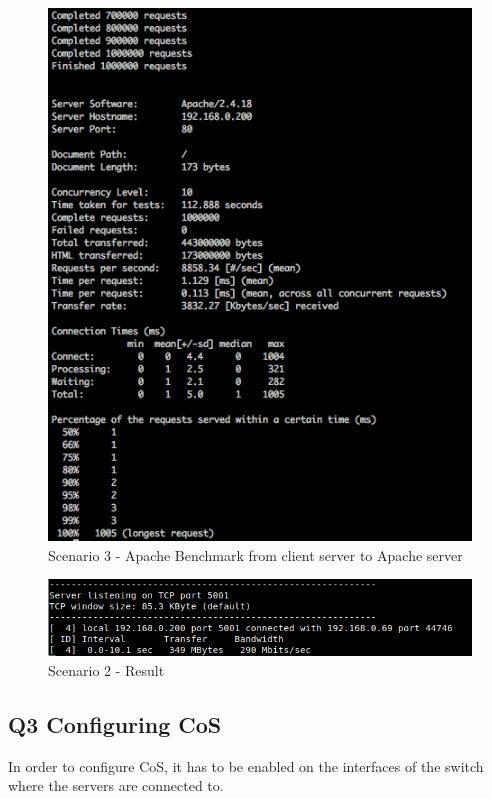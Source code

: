 \documentclass{article}
\begin{document}
\begin{figure}[H]
\includegraphics[width=14cm]{figures/calais-ab.png}
\centering
\caption{Scenario 3 - Apache Benchmark from client server to Apache server}
\centering
\label{fig:ab_calais_scenario_3}
\end{figure}




\begin{figure}[H]
\includegraphics[width=14cm]{figures/q-2-2-3-results.png}
\centering
\caption{Scenario 2 - Result}
\centering
\label{fig:throughput_scenario_3_result}
\end{figure}


\subsection{Q3 Configuring CoS}
In order to configure CoS, it has to be enabled on the interfaces of the switch where the servers are connected to.
\end{document}
